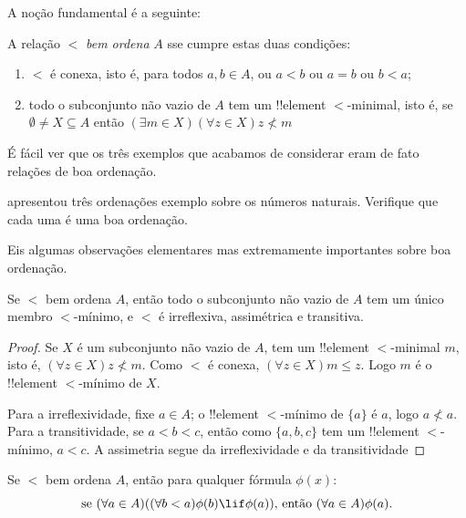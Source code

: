 \documentclass[../../../include/open-logic-section]{subfiles}
\begin{document}

A noção fundamental é a seguinte:

\begin{defn}
A relação $<$ \emph{bem ordena} $A$ sse cumpre estas duas condições:
\begin{enumerate}
	\item $<$ é conexa, isto é, para todos $a, b \in A$, ou $a < b$
	ou $a = b$ ou $b < a$;
	\item todo o subconjunto não vazio de $A$ tem um !!{element}
	$<$-minimal, isto é, se $\emptyset \neq X \subseteq A$ então $(\exists m \in
	X)(\forall z \in X)z \nless m$
\end{enumerate}
\end{defn}

É fácil ver que os três exemplos que acabamos de considerar eram de fato
relações de boa ordenação.

\begin{prob}
 apresentou três ordenações exemplo
sobre os números naturais. Verifique que cada uma é uma boa ordenação.
\end{prob}

Eis algumas observações elementares mas extremamente importantes sobre
boa ordenação.

\begin{prop}
Se $<$ bem ordena $A$, então todo o subconjunto não vazio de $A$ tem um
único membro $<$-mínimo, e $<$ é irreflexiva, assimétrica e transitiva.
\end{prop}

\begin{proof}
Se $X$ é um subconjunto não vazio de $A$, tem um !!{element} $<$-minimal
$m$, isto é, $(\forall z \in X)z \nless m$. Como $<$ é conexa,
$(\forall z \in X)m \leq z$. Logo $m$ é o !!{element} $<$-mínimo de $X$.

Para a irreflexividade, fixe $a \in A$; o !!{element} $<$-mínimo de $\{a\}$ é $a$, logo $a \nless a$. Para a transitividade, se $a < b < c$, então
como $\{a, b, c\}$ tem um !!{element} $<$-mínimo, $a < c$. A assimetria
segue da irreflexividade e da transitividade
\end{proof}

\begin{prop}
Se $<$ bem ordena $A$, então para qualquer fórmula $\phi(x)$:
\[
	\text{se }(\forall a \in A)((\forall b < a)\phi(b) \lif 
		\phi(a))\text{, então }(\forall a \in A)\phi(a).
\]
\end{prop}
\end{document}
